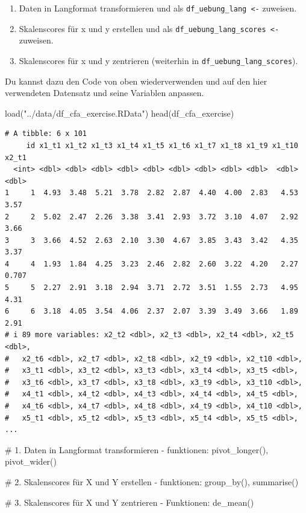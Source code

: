 \documentclass[
  letterpaper,
  DIV=11,
  numbers=noendperiod]{scrreprt}
\newenvironment{Shaded}{\begin{snugshade}}{\end{snugshade}}
\newcommand{\CommentTok}[1]{\textcolor[rgb]{0.37,0.37,0.37}{#1}}
\newcommand{\FunctionTok}[1]{\textcolor[rgb]{0.28,0.35,0.67}{#1}}
\newcommand{\NormalTok}[1]{\textcolor[rgb]{0.00,0.23,0.31}{#1}}
\newcommand{\StringTok}[1]{\textcolor[rgb]{0.13,0.47,0.30}{#1}}
\providecommand{\tightlist}{%
  \setlength{\itemsep}{0pt}\setlength{\parskip}{0pt}}\usepackage{longtable,booktabs,array}
\begin{document}
\begin{enumerate}
\def\labelenumi{\arabic{enumi})}
\tightlist
\item
  Daten in Langformat transformieren und als
  \texttt{df\_uebung\_lang\ \textless{}-} zuweisen.
\item
  Skalenscores für x und y erstellen und als
  \texttt{df\_uebung\_lang\_scores\ \textless{}-} zuweisen.
\item
  Skalenscores für x und y zentrieren (weiterhin in
  \texttt{df\_uebung\_lang\_scores}).
\end{enumerate}

Du kannst dazu den Code von oben wiederverwenden und auf den hier
verwendeten Datensatz und seine Variablen anpassen.

\begin{Shaded}
\begin{Highlighting}[]
\FunctionTok{load}\NormalTok{(}\StringTok{"../data/df\_cfa\_exercise.RData"}\NormalTok{)}
\FunctionTok{head}\NormalTok{(df\_cfa\_exercise)}
\end{Highlighting}
\end{Shaded}

\begin{verbatim}
# A tibble: 6 x 101
     id x1_t1 x1_t2 x1_t3 x1_t4 x1_t5 x1_t6 x1_t7 x1_t8 x1_t9 x1_t10 x2_t1
  <int> <dbl> <dbl> <dbl> <dbl> <dbl> <dbl> <dbl> <dbl> <dbl>  <dbl> <dbl>
1     1  4.93  3.48  5.21  3.78  2.82  2.87  4.40  4.00  2.83   4.53 3.57 
2     2  5.02  2.47  2.26  3.38  3.41  2.93  3.72  3.10  4.07   2.92 3.66 
3     3  3.66  4.52  2.63  2.10  3.30  4.67  3.85  3.43  3.42   4.35 3.37 
4     4  1.93  1.84  4.25  3.23  2.46  2.82  2.60  3.22  4.20   2.27 0.707
5     5  2.27  2.91  3.18  2.94  3.71  2.72  3.51  1.55  2.73   4.95 4.31 
6     6  3.18  4.05  3.54  4.06  2.37  2.07  3.39  3.49  3.66   1.89 2.91 
# i 89 more variables: x2_t2 <dbl>, x2_t3 <dbl>, x2_t4 <dbl>, x2_t5 <dbl>,
#   x2_t6 <dbl>, x2_t7 <dbl>, x2_t8 <dbl>, x2_t9 <dbl>, x2_t10 <dbl>,
#   x3_t1 <dbl>, x3_t2 <dbl>, x3_t3 <dbl>, x3_t4 <dbl>, x3_t5 <dbl>,
#   x3_t6 <dbl>, x3_t7 <dbl>, x3_t8 <dbl>, x3_t9 <dbl>, x3_t10 <dbl>,
#   x4_t1 <dbl>, x4_t2 <dbl>, x4_t3 <dbl>, x4_t4 <dbl>, x4_t5 <dbl>,
#   x4_t6 <dbl>, x4_t7 <dbl>, x4_t8 <dbl>, x4_t9 <dbl>, x4_t10 <dbl>,
#   x5_t1 <dbl>, x5_t2 <dbl>, x5_t3 <dbl>, x5_t4 <dbl>, x5_t5 <dbl>, ...
\end{verbatim}

\begin{Shaded}
\begin{Highlighting}[]
\CommentTok{\# 1. Daten in Langformat transformieren {-} funktionen: pivot\_longer(), pivot\_wider()}


\CommentTok{\# 2. Skalenscores für X und Y erstellen {-} funktionen: group\_by(), summarise()}

\CommentTok{\# 3. Skalenscores für X und Y zentrieren {-} Funktionen: de\_mean()}
\end{Highlighting}
\end{Shaded}
\end{document}
